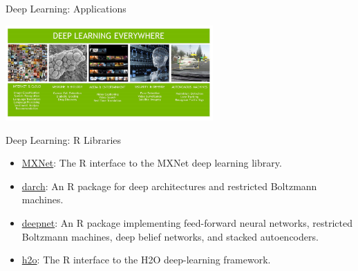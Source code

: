 \documentclass[ignorenonframetext,]{beamer}
\providecommand{\tightlist}{%
\setlength{\itemsep}{0pt}\setlength{\parskip}{0pt}}
\begin{document}
\begin{frame}{Deep Learning: Applications}

\includegraphics[width=300px]{images/deep_learning_applications}

\end{frame}

\begin{frame}{Deep Learning: R Libraries}

\begin{itemize}
\tightlist
\item
  \href{http://mxnet.io/api/r/index.html}{MXNet}: The R interface to the
  MXNet deep learning library.
\item
  \href{https://github.com/maddin79/darch}{darch}: An R package for deep
  architectures and restricted Boltzmann machines.
\item
  \href{https://mran.microsoft.com/package/deepnet/}{deepnet}: An R
  package implementing feed-forward neural networks, restricted
  Boltzmann machines, deep belief networks, and stacked autoencoders.
\item
  \href{https://github.com/h2oai/h2o-3}{h2o}: The R interface to the H2O
  deep-learning framework.
\end{itemize}

\end{frame}
\end{document}
